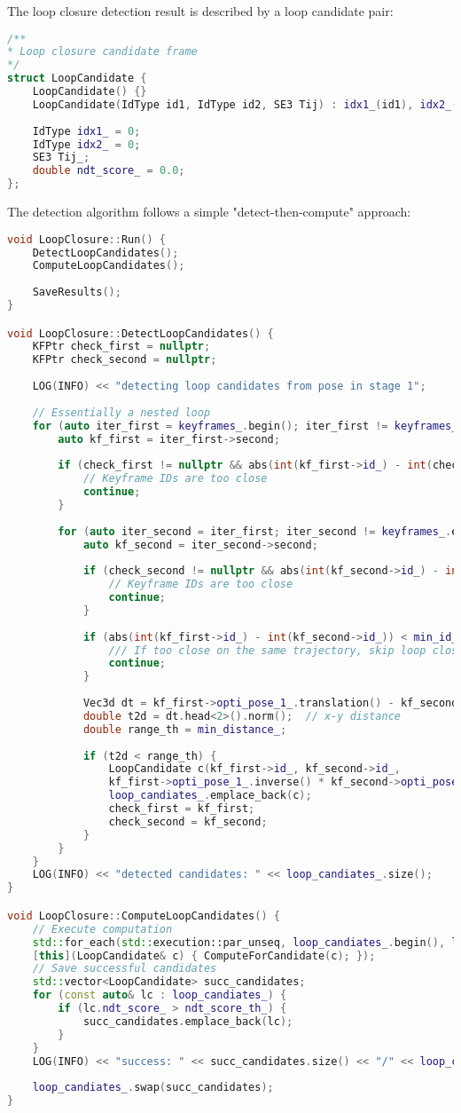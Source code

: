 The loop closure detection result is described by a loop candidate pair:
\begin{lstlisting}[language=c++,caption=src/ch9/loopclosure.h]
/**
* Loop closure candidate frame
*/
struct LoopCandidate {
	LoopCandidate() {}
	LoopCandidate(IdType id1, IdType id2, SE3 Tij) : idx1_(id1), idx2_(id2), Tij_(Tij) {}
	
	IdType idx1_ = 0;
	IdType idx2_ = 0;
	SE3 Tij_;
	double ndt_score_ = 0.0;
};
\end{lstlisting}

The detection algorithm follows a simple "detect-then-compute" approach:
\begin{lstlisting}[language=c++,caption=src/ch9/loopclosure.cc]
void LoopClosure::Run() {
	DetectLoopCandidates();
	ComputeLoopCandidates();
	
	SaveResults();
}

void LoopClosure::DetectLoopCandidates() {
	KFPtr check_first = nullptr;
	KFPtr check_second = nullptr;
	
	LOG(INFO) << "detecting loop candidates from pose in stage 1";
	
	// Essentially a nested loop
	for (auto iter_first = keyframes_.begin(); iter_first != keyframes_.end(); ++iter_first) {
		auto kf_first = iter_first->second;
		
		if (check_first != nullptr && abs(int(kf_first->id_) - int(check_first->id_)) <= skip_id_) {
			// Keyframe IDs are too close
			continue;
		}
		
		for (auto iter_second = iter_first; iter_second != keyframes_.end(); ++iter_second) {
			auto kf_second = iter_second->second;
			
			if (check_second != nullptr && abs(int(kf_second->id_) - int(check_second->id_)) <= skip_id_) {
				// Keyframe IDs are too close
				continue;
			}
			
			if (abs(int(kf_first->id_) - int(kf_second->id_)) < min_id_interval_) {
				/// If too close on the same trajectory, skip loop closure
				continue;
			}
			
			Vec3d dt = kf_first->opti_pose_1_.translation() - kf_second->opti_pose_1_.translation();
			double t2d = dt.head<2>().norm();  // x-y distance
			double range_th = min_distance_;
			
			if (t2d < range_th) {
				LoopCandidate c(kf_first->id_, kf_second->id_,
				kf_first->opti_pose_1_.inverse() * kf_second->opti_pose_1_);
				loop_candiates_.emplace_back(c);
				check_first = kf_first;
				check_second = kf_second;
			}
		}
	}
	LOG(INFO) << "detected candidates: " << loop_candiates_.size();
}

void LoopClosure::ComputeLoopCandidates() {
	// Execute computation
	std::for_each(std::execution::par_unseq, loop_candiates_.begin(), loop_candiates_.end(),
	[this](LoopCandidate& c) { ComputeForCandidate(c); });
	// Save successful candidates
	std::vector<LoopCandidate> succ_candidates;
	for (const auto& lc : loop_candiates_) {
		if (lc.ndt_score_ > ndt_score_th_) {
			succ_candidates.emplace_back(lc);
		}
	}
	LOG(INFO) << "success: " << succ_candidates.size() << "/" << loop_candiates_.size();
	
	loop_candiates_.swap(succ_candidates);
}
\end{lstlisting}


